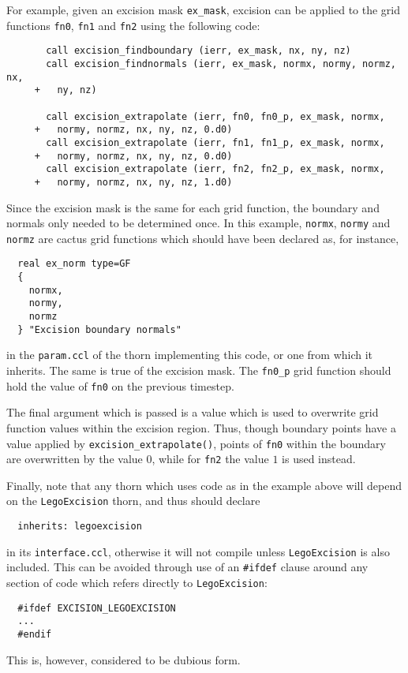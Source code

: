 \documentclass{article}
\begin{document}
For example, given an excision mask \texttt{ex\_mask}, excision can
be applied to the grid functions \texttt{fn0}, \texttt{fn1}
and \texttt{fn2} using the following code:

\begin{verbatim}
       call excision_findboundary (ierr, ex_mask, nx, ny, nz)
       call excision_findnormals (ierr, ex_mask, normx, normy, normz, nx,
     +   ny, nz)

       call excision_extrapolate (ierr, fn0, fn0_p, ex_mask, normx,
     +   normy, normz, nx, ny, nz, 0.d0)
       call excision_extrapolate (ierr, fn1, fn1_p, ex_mask, normx,
     +   normy, normz, nx, ny, nz, 0.d0)
       call excision_extrapolate (ierr, fn2, fn2_p, ex_mask, normx,
     +   normy, normz, nx, ny, nz, 1.d0)
\end{verbatim}

Since  the excision  mask  is the  same  for each  grid function,  the
boundary  and normals  only  needed  to be  determined  once. In  this
example, \texttt{normx}, \texttt{normy}  and \texttt{normz} are cactus
grid functions which should have been declared as, for instance,
\begin{verbatim}
  real ex_norm type=GF
  {
    normx,
    normy,
    normz
  } "Excision boundary normals"
\end{verbatim}
in the \texttt{param.ccl} of the thorn implementing this code, or one
from which it inherits. The same is true of the excision mask.  The
\texttt{fn0\_p} grid function should hold the value of \texttt{fn0} on
the previous timestep.

The final argument which is passed is a value which is used to
overwrite grid function values within the excision region. Thus,
though boundary points have a value applied by
\texttt{excision\_extrapolate()}, points of \texttt{fn0} within the
boundary are overwritten by the value $0$, while for \texttt{fn2} the
value $1$ is used instead.

Finally, note that any thorn which uses code as in the example above
will depend on the \texttt{LegoExcision} thorn, and thus should
declare
\begin{verbatim}
  inherits: legoexcision
\end{verbatim}
in its \texttt{interface.ccl}, otherwise it will not compile unless
\texttt{LegoExcision} is also included. This can be avoided through
use of an \texttt{\#ifdef} clause around any section of code which
refers directly to \texttt{LegoExcision}:
\begin{verbatim}
  #ifdef EXCISION_LEGOEXCISION
  ...
  #endif
\end{verbatim}
This is, however, considered to be dubious form.
\end{document}
